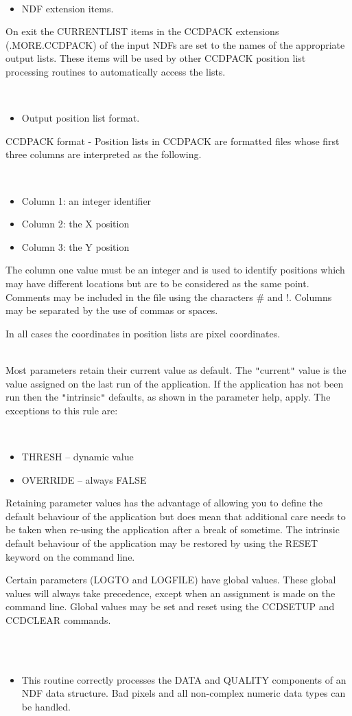\documentclass[twoside,11pt]{article}
\newcommand{\htmlref}[2]{#1}
\renewcommand{\_}{\texttt{\symbol{95}}}
\newcommand{\qt}[1]{{\tt "}#1{\tt "}}
\newcommand{\xroutine}[1]{\htmlref{{\sc #1}}{#1}}
\newcommand{\sstdiytopic}[2]{\item[#1:] \mbox{} \\[1.3ex] #2}
\newcommand{\sstimplementationstatus}[1]{
   \item[{Implementation Status:}] \mbox{} \\[1.3ex] #1}
\newcommand{\sstitemlist}[1]{
  \mbox{} \\
  \vspace{-3.5ex}
  \begin{itemize}
     #1
  \end{itemize}
}
\newcommand{\sstitem}{\item}
\newcommand{\sstdiytopic}[2]{\item[{#1}] #2 }
\newcommand{\sstimplementationstatus}[1]{
      \item[Implementation Status:] #1
   }
\newcommand{\sstitemlist}[1]{
      \begin{itemize}
         #1
      \end{itemize}
      \\
   }
\newcommand{\sstitem}{\item}
\begin{document}
{{      \sstitemlist{

         \sstitem
         NDF extension items.

      }
        On exit the CURRENT\_LIST items in the CCDPACK extensions
        (.MORE.CCDPACK) of the input NDFs are set to the names of the
        appropriate output lists. These items will be used by other
        CCDPACK position list processing routines to automatically
        access the lists.

      \sstitemlist{

         \sstitem
         Output position list format.

      }
        CCDPACK format - Position lists in CCDPACK are formatted files
        whose first three columns are interpreted as the following.

      \sstitemlist{

         \sstitem
              Column 1: an integer identifier

         \sstitem
              Column 2: the X position

         \sstitem
              Column 3: the Y position

      }
        The column one value must be an integer and is used to identify
        positions which may have different locations but are to be
        considered as the same point. Comments may be included in the
        file using the characters \# and !. Columns may be separated by
        the use of commas or spaces.

        In all cases the coordinates in position lists are pixel 
        coordinates.
   }
   \sstdiytopic{
      Behaviour of parameters
   } {
      Most parameters retain their current value as default. The
      \qt{current} value is the value assigned on the last run of the
      application. If the application has not been run then the
      \qt{intrinsic} defaults, as shown in the parameter help, apply.
      The exceptions to this rule are:
      \sstitemlist{

         \sstitem
            THRESH   -- dynamic value
         \sstitem
            OVERRIDE -- always FALSE

      }
      Retaining parameter values has the advantage of allowing you to
      define the default behaviour of the application but does mean
      that additional care needs to be taken when re-using the
      application after a break of sometime. The intrinsic default
      behaviour of the application may be restored by using the RESET
      keyword on the command line.

      Certain parameters (LOGTO and LOGFILE) have global values. These
      global values will always take precedence, except when an
      assignment is made on the command line.  Global values may be set
      and reset using the \xroutine{CCDSETUP} and \xroutine{CCDCLEAR} commands.
   }
   \sstimplementationstatus{
      \sstitemlist{

         \sstitem
         This routine correctly processes the DATA and QUALITY components
           of an NDF data structure. Bad pixels and all non-complex numeric
           data types can be handled.
      }
   }
}
\end{document}

